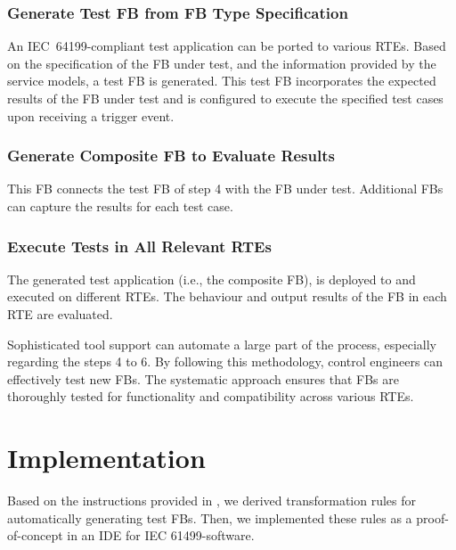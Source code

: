\documentclass[conference]{IEEEtran}
\begin{document}
  
\subsubsection{Generate Test FB from FB Type Specification}
    An IEC~64199-compliant test application can be ported to various RTEs.
   Based on the specification of the FB under test, and the information provided by the service models, a test FB is generated. This test FB incorporates the expected results of the FB under test and is configured to execute the specified test cases upon receiving a trigger event.
   
\subsubsection{Generate Composite FB to Evaluate Results}
  This FB connects the test FB of step 4 with the FB under test. 
   Additional FBs can capture the results for each test case.
   
\subsubsection{Execute Tests in All Relevant RTEs}
   The generated test application (i.e., the composite FB), is deployed to and executed on different RTEs. The behaviour and output results of the FB in each RTE are evaluated.

Sophisticated tool support can automate a large part of the process, especially regarding the steps 4 to 6. By following this methodology, control engineers can effectively test new FBs. The systematic approach ensures that FBs are thoroughly tested for functionality and compatibility across various RTEs.

\section{Implementation}
Based on the instructions provided in \cite{Testing_Midhun}, we derived transformation rules for automatically generating test FBs. Then, we implemented these rules as a proof-of-concept in an IDE for IEC 61499-software.
\end{document}
